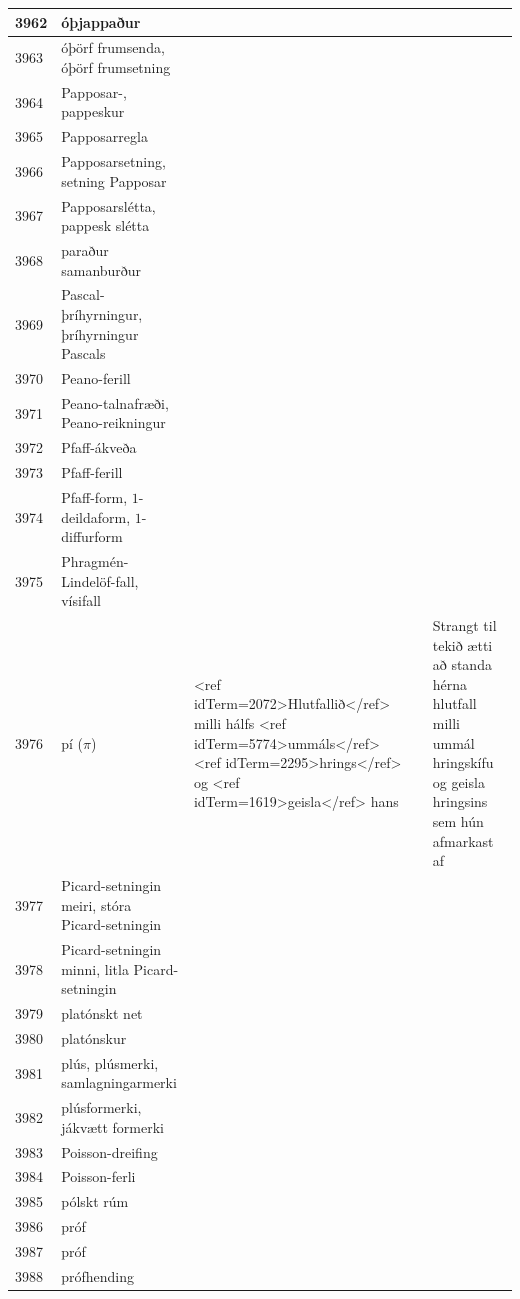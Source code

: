 \begin{longtable}{p{}|p{}|p{}|p{}|p{}}
\hline
3962 & óþjappaður &  &  &  \\
\hline
3963 & óþörf frumsenda, óþörf frumsetning &  &  &  \\
\hline
3964 & Papposar-, pappeskur &  &  &  \\
\hline
3965 & Papposarregla &  &  &  \\
\hline
3966 & Papposarsetning, setning Papposar &  &  &  \\
\hline
3967 & Papposarslétta, pappesk slétta &  &  &  \\
\hline
3968 & paraður samanburður &  &  &  \\
\hline
3969 & Pascal-þríhyrningur, þríhyrningur Pascals &  &  &  \\
\hline
3970 & Peano-ferill &  &  &  \\
\hline
3971 & Peano-talnafræði, Peano-reikningur &  &  &  \\
\hline
3972 & Pfaff-ákveða &  &  &  \\
\hline
3973 & Pfaff-ferill &  &  &  \\
\hline
3974 & Pfaff-form, \(1\)-deildaform, \(1\)-diffurform &  &  &  \\
\hline
3975 & Phragmén-Lindelöf-fall, vísifall &  &  &  \\
\hline
3976 & pí (\(\pi\)) & <ref idTerm=2072>Hlutfallið</ref> milli hálfs <ref idTerm=5774>ummáls</ref> <ref idTerm=2295>hrings</ref> og <ref idTerm=1619>geisla</ref> hans &  & Strangt til tekið ætti að standa hérna hlutfall milli ummál hringskífu og geisla hringsins sem hún afmarkast af \\
\hline
3977 & Picard-setningin meiri, stóra Picard-setningin &  &  &  \\
\hline
3978 & Picard-setningin minni, litla Picard-setningin &  &  &  \\
\hline
3979 & platónskt net &  &  &  \\
\hline
3980 & platónskur &  &  &  \\
\hline
3981 & plús, plúsmerki, samlagningarmerki &  &  &  \\
\hline
3982 & plúsformerki, jákvætt formerki &  &  &  \\
\hline
3983 & Poisson-dreifing &  &  &  \\
\hline
3984 & Poisson-ferli &  &  &  \\
\hline
3985 & pólskt rúm &  &  &  \\
\hline
3986 & próf &  &  &  \\
\hline
3987 & próf &  &  &  \\
\hline
3988 & prófhending &  &  &  \\

\end{longtable}
